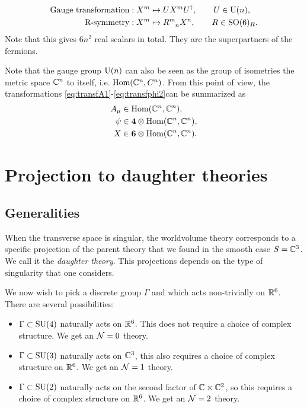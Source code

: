 \documentclass[a4paper,11pt]{article}
\begin{document}
\begin{itemize}
            \begin{align}
                \text{Gauge transformation} &: X^m \mapsto U X^m U^\dagger ,\qquad U\in\U(n),\label{eq:transfphi1}\\
                \text{R-symmetry} &: X^m \mapsto R\indices{^m_n}X^n,\qquad R\in\SO(6)_R.\label{eq:transfphi2}
            \end{align}
            Note that this gives $6n^2$ real scalars in total. They are the superpartners of the fermions\marker.
        \end{itemize}
        Note that the gauge group $\text{U}(n)$ can also be seen as the group of isometries the metric space $\mathbb{C}^n$ to itself, i.e. $\text{Hom}(\mathbb{C}^n,C^n)$. From this point of view, the transformations \eqref{eq:transfA1}-\eqref{eq:transfphi2}can be summarized as
        \begin{align}
            A_\mu&\in\text{Hom}(\mathbb{C}^n,\mathbb{C}^n),\label{eq:AHom}\\
            \psi&\in\boldsymbol{4}\otimes\text{Hom}(\mathbb{C}^n,\mathbb{C}^n),\label{eq:psiHom}\\
            X&\in\boldsymbol{6}\otimes\text{Hom}(\mathbb{C}^n,\mathbb{C}^n).\label{eq:phiHom}
        \end{align}


\section{Projection to daughter theories}

    \subsection{Generalities}

        When the transverse space is singular, the worldvolume theory corresponds to a specific projection of the parent theory that we found in the smooth case $S=\mathbb{C}^3$. We call it the \emph{daughter theory}. This projections depends on the type of singularity that one considers.

        We now wish to pick a discrete group $\Gamma$ and which acts non-trivially on $\mathbb{R}^6$. There are several possibilities:
        \begin{itemize}
            \item $\Gamma\subset\text{SU}(4)$ naturally acts on $\mathbb{R}^6$. This does not require a choice of complex structure. We get an $\mathcal{N}=0$ theory.
            \item $\Gamma\subset\text{SU}(3)$ naturally acts on $\mathbb{C}^3$, this also requires a choice of complex structure on $\mathbb{R}^6$. We get an $\mathcal{N}=1$ theory.
            \item $\Gamma\subset\text{SU}(2)$ naturally acts on the second factor of $\mathbb{C}\times\mathbb{C}^2$, so this requires a choice of complex structure on $\mathbb{R}^6$. We get an $\mathcal{N}=2$ theory.
        \end{itemize}
\end{document}

